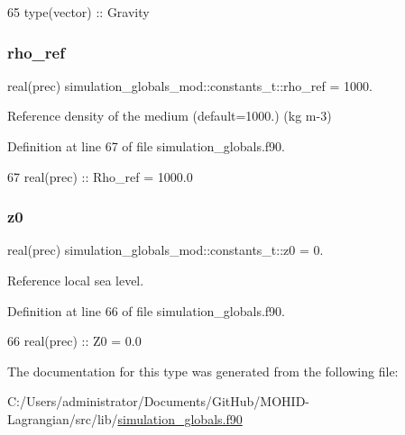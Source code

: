 \begin{DoxyCode}
65         \textcolor{keywordtype}{type}(vector) :: Gravity
\end{DoxyCode}
\mbox{\label{structsimulation__globals__mod_1_1constants__t_a7e4a2bb5206340621bfce6792b527f6d}} 
\subsubsection{\texorpdfstring{rho\+\_\+ref}{rho\_ref}}
{\footnotesize\ttfamily real(prec) simulation\+\_\+globals\+\_\+mod\+::constants\+\_\+t\+::rho\+\_\+ref = 1000.\hspace{0.3cm}{\ttfamily [private]}}



Reference density of the medium (default=1000.) (kg m-\/3) 



Definition at line 67 of file simulation\+\_\+globals.\+f90.


\begin{DoxyCode}
67         \textcolor{keywordtype}{real(prec)}   :: Rho\_ref = 1000.0
\end{DoxyCode}
\mbox{\label{structsimulation__globals__mod_1_1constants__t_a737e824cf720aea683fe23939d12aa5b}} 
\subsubsection{\texorpdfstring{z0}{z0}}
{\footnotesize\ttfamily real(prec) simulation\+\_\+globals\+\_\+mod\+::constants\+\_\+t\+::z0 = 0.\hspace{0.3cm}{\ttfamily [private]}}



Reference local sea level. 



Definition at line 66 of file simulation\+\_\+globals.\+f90.


\begin{DoxyCode}
66         \textcolor{keywordtype}{real(prec)}   :: Z0 = 0.0
\end{DoxyCode}


The documentation for this type was generated from the following file\+:\begin{DoxyCompactItemize}
\item 
C\+:/\+Users/administrator/\+Documents/\+Git\+Hub/\+M\+O\+H\+I\+D-\/\+Lagrangian/src/lib/\mbox{\hyperlink{simulation__globals_8f90}{simulation\+\_\+globals.\+f90}}\end{DoxyCompactItemize}
